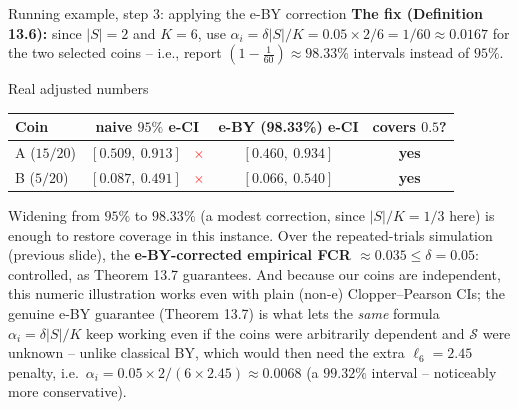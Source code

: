 \documentclass[aspectratio=169,10pt]{beamer}
\newcommand{\calS}{\mathcal{S}}
\begin{document}
\begin{frame}{Running example, step 3: applying the e-BY correction}
  \textbf{The fix (Definition 13.6):} since $|S|=2$ and $K=6$, use $\alpha_i = \delta|S|/K = 0.05\times2/6 = 1/60 \approx 0.0167$ for the two selected coins -- i.e., report $(1-\tfrac1{60}) \approx 98.33\%$ intervals instead of $95\%$.

  \begin{block}{Real adjusted numbers}
    \begin{center}
    \begin{tabular}{lccc}
      \toprule
      Coin & naive $95\%$ e-CI & e-BY (98.33\%) e-CI & covers $0.5$? \\
      \midrule
      A ($15/20$) & $[0.509,\ 0.913]$ \ \textcolor{red}{$\times$} & $[0.460,\ 0.934]$ & \textbf{yes} \\
      B ($5/20$)  & $[0.087,\ 0.491]$ \ \textcolor{red}{$\times$} & $[0.066,\ 0.540]$ & \textbf{yes} \\
      \bottomrule
    \end{tabular}
    \end{center}
  \end{block}
  Widening from $95\%$ to $98.33\%$ (a modest correction, since $|S|/K=1/3$ here) is enough to restore coverage in this instance. Over the repeated-trials simulation (previous slide), the \textbf{e-BY-corrected empirical FCR $\approx 0.035 \le \delta = 0.05$}: controlled, as Theorem 13.7 guarantees. And because our coins are independent, this numeric illustration works even with plain (non-e) Clopper--Pearson CIs; the genuine e-BY guarantee (Theorem 13.7) is what lets the \emph{same} formula $\alpha_i=\delta|S|/K$ keep working even if the coins were arbitrarily dependent and $\calS$ were unknown -- unlike classical BY, which would then need the extra $\ell_6=2.45$ penalty, i.e.\ $\alpha_i = 0.05\times2/(6\times2.45) \approx 0.0068$ (a $99.32\%$ interval -- noticeably more conservative).
\end{frame}
\end{document}
